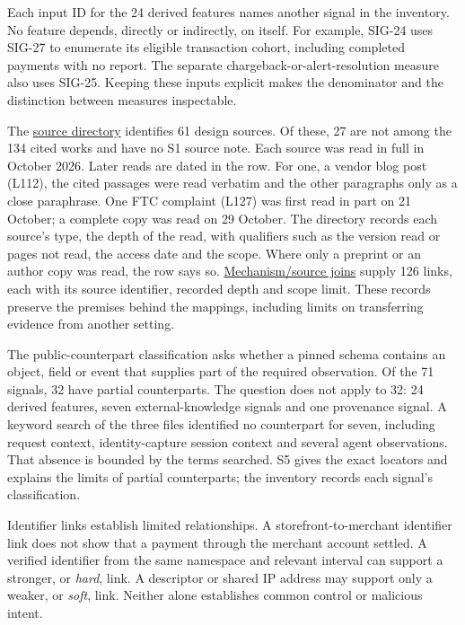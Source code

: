 \documentclass[
  11pt,
]{article}
\begin{document}
Each input ID for the 24 derived features names another signal in the
inventory. No feature depends, directly or indirectly, on itself. For
example, \mbox{SIG-24} uses \mbox{SIG-27} to enumerate its eligible
transaction cohort, including completed payments with no report. The
separate chargeback-or-alert-resolution measure also uses \mbox{SIG-25}.
Keeping these inputs explicit makes the denominator and the distinction
between measures inspectable.

The \href{SUPPLEMENT/S3_SOURCE_DIRECTORY.csv}{source directory}
identifies 61 design sources. Of these, 27 are not among the 134 cited
works and have no S1 source note. Each source was read in full in
October 2026. Later reads are dated in the row. For one, a vendor blog
post (L112), the cited passages were read verbatim and the other
paragraphs only as a close paraphrase. One FTC complaint (L127) was
first read in part on 21 October; a complete copy was read on 29
October. The directory records each source's type, the depth of the
read, with qualifiers such as the version read or pages not read, the
access date and the scope. Where only a preprint or an author copy was
read, the row says so.
\href{SUPPLEMENT/S3_MAPPING_SOURCE_JOINS.csv}{Mechanism/source joins}
supply 126 links, each with its source identifier, recorded depth and
scope limit. These records preserve the premises behind the mappings,
including limits on transferring evidence from another setting.

The public-counterpart classification asks whether a pinned schema
contains an object, field or event that supplies part of the required
observation. Of the 71 signals, 32 have partial counterparts. The
question does not apply to 32: 24 derived features, seven
external-knowledge signals and one provenance signal. A keyword search
of the three files identified no counterpart for seven, including
request context, identity-capture session context and several agent
observations. That absence is bounded by the terms searched. S5 gives
the exact locators and explains the limits of partial counterparts; the
inventory records each signal's classification.

Identifier links establish limited relationships. A
storefront-to-merchant identifier link does not show that a payment
through the merchant account settled. A verified identifier from the
same namespace and relevant interval can support a stronger, or
\emph{hard}, link. A descriptor or shared IP address may support only a
weaker, or \emph{soft}, link. Neither alone establishes common control
or malicious intent.
\end{document}
